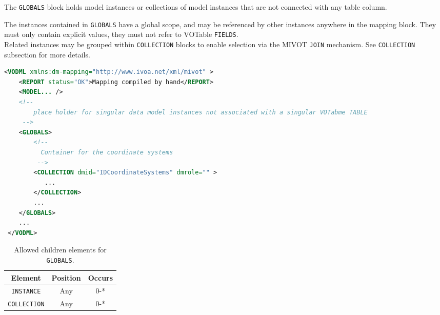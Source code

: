 The \texttt{GLOBALS} block holds model instances or collections of model instances 
that are not connected with any table column. 

The instances contained in \texttt{GLOBALS} have a global scope, and may be
referenced by other instances anywhere in the mapping block.  
They must only contain
explicit values, they must not refer to VOTable \texttt{FIELDS}.  \\ 

Related instances may be grouped within \texttt{COLLECTION} blocks to enable selection
via the MIVOT \texttt{JOIN} mechanism.  
See \texttt{COLLECTION} subsection for more details.

\begin{lstlisting}[caption={Example \texttt{GLOBALS} block (see in \ref{GLOBALS_snippet}) which contains a collection of coordinate systems.},language=XML]
<VODML xmlns:dm-mapping="http://www.ivoa.net/xml/mivot" >
    <REPORT status="OK">Mapping compiled by hand</REPORT>
    <MODEL... />
    <!--	             
        place holder for singular data model instances not associated with a singular VOTabme TABLE
     -->
    <GLOBALS>
        <!--
          Container for the coordinate systems
         -->
        <COLLECTION dmid="IDCoordinateSystems" dmrole="" >
           ...
        </COLLECTION>
        ...
    </GLOBALS>
    ...
 </VODML>
\end{lstlisting}


\begin{table}[!htbp]
  \small
  \centering
  \begin{tabulary}{\linewidth}{|c |c |c|}
    \hline 
        \textbf{Element} &
        \textbf{Position} &
        \textbf{Occurs}\\
    \hline
    \hline
        \texttt{INSTANCE} &
        Any &
        0-*\\
    \hline
        \texttt{COLLECTION} &
        Any &
        0-*\\
    \hline
  \end{tabulary}
  \caption{Allowed children elements for \texttt{GLOBALS}.} 
  \label{tbl:globals-children}
 \end{table}
